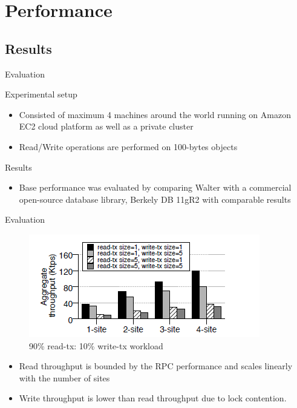\documentclass{beamer}
\begin{document}
	 	
\section{Performance}

	\subsection{Results}

	\begin{frame}{Evaluation}
	
	Experimental setup
	
	\begin{itemize}
	\item Consisted of maximum 4 machines around the world running on Amazon EC2 cloud platform as well as a private cluster
	\item Read/Write operations are performed on 100-bytes objects
	\end{itemize}	
	\pause
	Results
	\begin{itemize}
	\item Base performance was evaluated by comparing Walter with a commercial open-source database library, Berkely DB 11gR2 with comparable results
	\end{itemize}	
	
	\end{frame}	
	
	\begin{frame}{Evaluation}	
	
	\begin{figure}[H]
	\includegraphics[scale=0.6]{img/fig_evaluation01.png}
	\caption{90\% read-tx: 10\% write-tx workload}
	\end{figure}	
	
	\begin{itemize}	
	\item Read throughput is bounded by the RPC performance and scales linearly with the number of sites	
	\item Write throughput is lower than read throughput due to lock contention. 	
	\end{itemize}
	
	\end{frame}
	
\end{document}
